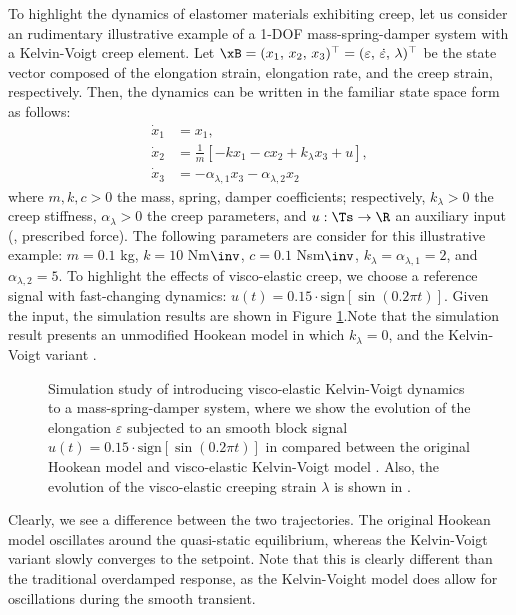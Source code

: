 \begin{example} To highlight the dynamics of elastomer materials exhibiting creep, let us consider an rudimentary illustrative example of a 1-DOF mass-spring-damper system with a Kelvin-Voigt creep element. Let $\xB = (x_1,\,x_2,\,x_3)^\top = (\varepsilon,\, \dot{\varepsilon},\, \lambda)^\top$ be the state vector composed of the elongation strain, elongation rate, and the creep strain, respectively. Then, the dynamics can be written in the familiar state space form as follows:
%
\begin{align}
\dot{x}_1 & = x_1, \\
\dot{x}_2 & = \frac{1}{m}\left[ -k x_1 - c x_2 + k_\lambda x_3 + u \right], \\
\dot{x}_3 & = -\alpha_{\lambda,1}x_3 -\alpha_{\lambda,2}x_2
\end{align}
%
where $m,k,c>0$  the mass, spring, damper coefficients; respectively, $k_{\lambda}>0$ the creep stiffness, $\alpha_{\lambda}>0$ the creep parameters, and $u: \Ts \to \R$ an auxiliary input (\ie, prescribed force). The following parameters are consider for this illustrative example: $m = 0.1$ \si{\kilo \gram}, $k = 10$ Nm$\inv$, $c = 0.1$ Nsm$\inv$, $k_{\lambda} = \alpha_{\lambda,1} = 2$, and $\alpha_{\lambda,2} = 5$. \editl To highlight the effects of visco-elastic creep, we choose a reference signal with fast-changing dynamics: $u(t) = 0.15\cdot \textrm{sign}\left[ \sin(0.2\pi t) \right]$. Given the input, the simulation results are shown in Figure \ref{fig:C2:creep}.\editr Note that the simulation result presents an unmodified Hookean model  in which $k_\lambda = 0$, and the Kelvin-Voigt variant .
%
\begin{figure}[!h]
   
   \vspace{-0.2cm}
   \caption{Simulation study of introducing visco-elastic Kelvin-Voigt dynamics to a mass-spring-damper system, where we show the evolution of the elongation $\varepsilon$ subjected to an smooth block signal $u(t) = 0.15\cdot \textrm{sign}\left[ \sin(0.2\pi t) \right]$ in  compared between the original Hookean model  and visco-elastic Kelvin-Voigt model . Also, the evolution of the visco-elastic creeping strain $\lambda$ is shown in .}
   \vspace{-0.1cm}
   \label{fig:C2:creep}
 \end{figure}
%
Clearly, we see a difference between the two trajectories. The original Hookean model oscillates around the quasi-static equilibrium, whereas the Kelvin-Voigt variant slowly converges to the setpoint. Note that this is clearly different than the traditional overdamped response, as the Kelvin-Voight model does allow for oscillations during the smooth transient. %
%


\end{example}
